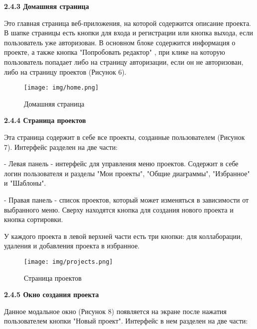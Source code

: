 \textbf{\large 2.4.3 Домашняя страница}

Это главная страница веб-приложения, на которой содержится описание проекта.
В шапке страницы есть кнопки для входа и регистрации или кнопка выхода, если пользователь уже авторизован. В основном блоке содержится информация о проекте, а также кнопка "Попробовать редактор" , при клике на которую пользователь попадает либо на страницу авторизации, если он не авторизован, либо на страницу проектов (Рисунок 6).

\renewcommand{\figurename}{Рисунок}
\begin{figure}[htbp]
    \centering %
    \texttt{[image: img/home.png]}
    \caption{Домашняя страница}
    \label{fig:analyze} %
\end{figure}

\textbf{\large 2.4.4 Страница проектов}

Эта страница содержит в себе все проекты, созданные пользователем (Рисунок 7). Интерфейс разделен на две части:

    - Левая панель - интерфейс для управления меню проектов. Содержит в себе логин пользователя и разделы "Мои проекты", "Общие диаграммы", "Избранное" и "Шаблоны".
    
    - Правая панель - список проектов, который может изменяться в зависимости от выбранного меню. Сверху находятся кнопка для создания нового проекта и кнопка сортировки.

У каждого проекта в левой верхней части есть три кнопки: для коллаборации, удаления и добавления проекта в избранное.

\renewcommand{\figurename}{Рисунок}
\begin{figure}[htbp]
    \centering %
    \texttt{[image: img/projects.png]}
    \caption{Страница проектов}
    \label{fig:analyze} %
\end{figure}

\newpage

\textbf{\large 2.4.5 Окно создания проекта}

Данное модальное окно (Рисунок 8) появляется на экране после нажатия пользователем кнопки "Новый проект". Интерфейс в нем разделен на две части:

